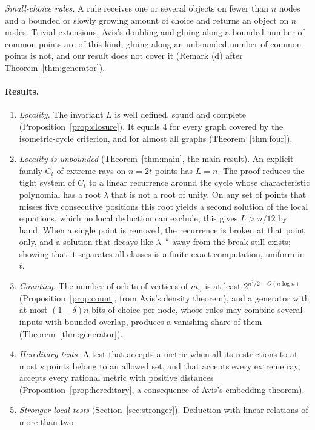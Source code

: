 \documentclass[11pt,a4paper]{article}
\theoremstyle{definition}
\theoremstyle{remark}
\begin{document}
\emph{Small-choice rules.} A rule receives one or several objects on fewer than $n$ nodes and a bounded or slowly
growing amount of choice and returns an object on $n$ nodes. Trivial extensions, Avis's doubling and gluing along a
bounded number of common points are of this kind; gluing along an unbounded number of common points is not, and our
result does not cover it (Remark (d) after Theorem~\ref{thm:generator}).

\paragraph{Results.}
\begin{enumerate}[leftmargin=*]
\item \emph{Locality.} The invariant $L$ is well defined, sound and complete (Proposition~\ref{prop:closure}). It
  equals 4 for every graph covered by the isometric-cycle criterion, and for almost all graphs
  (Theorem~\ref{thm:four}).
\item \emph{Locality is unbounded} (Theorem~\ref{thm:main}, the main result). An explicit family $C_t$ of extreme
  rays on $n = 2t$ points has $L = n$. The proof reduces the tight system of $C_t$ to a linear recurrence around the
  cycle whose characteristic polynomial has a root $\lambda$ that is not a root of unity. On any set of points that
  misses five consecutive positions this root yields a second solution of the local equations, which no local
  deduction can exclude; this gives $L > n/12$ by hand. When a single point is removed, the recurrence is broken at
  that point only, and a solution that decays like $\lambda^{-k}$ away from the break still exists; showing that it
  separates all classes is a finite exact computation, uniform in $t$.
\item \emph{Counting.} The number of orbits of vertices of $m_n$ is at least $2^{n^2/2 - O(n \log n)}$
  (Proposition~\ref{prop:count}, from Avis's density theorem), and a generator with at most $(1 - \delta)n$ bits of
  choice per node, whose rules may combine several inputs with bounded overlap, produces a vanishing share of them
  (Theorem~\ref{thm:generator}).
\item \emph{Hereditary tests.} A test that accepts a metric when all its restrictions to at most $s$ points belong
  to an allowed set, and that accepts every extreme ray, accepts every rational metric with positive distances
  (Proposition~\ref{prop:hereditary}, a consequence of Avis's embedding theorem).
\item \emph{Stronger local tests} (Section~\ref{sec:stronger}). Deduction with linear relations of more than two

\end{enumerate}
\end{document}
